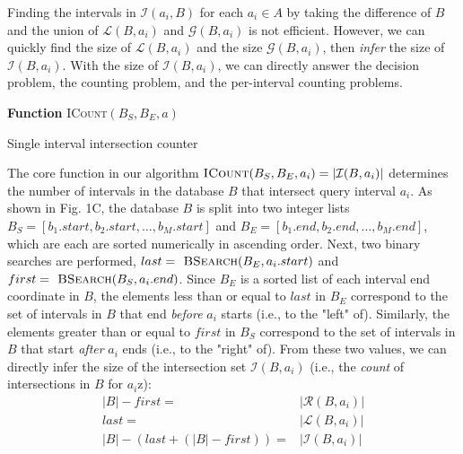 \documentclass{bioinfo}
\begin{document}
Finding the intervals in $\mathcal{I}(a_i,B)$ for each $a_i\in A$ by taking the
difference of $B$ and the union of $\mathcal{L}(B,a_i)$ and $\mathcal{G}(B,a_i)$
is not efficient.  However, we can quickly find the size of $\mathcal{L}(B,a_i)$
and the size $\mathcal{G}(B,a_i)$, then \emph{infer} the size of
$\mathcal{I}(B,a_i)$.  With the size of $\mathcal{I}(B,a_i)$, we can directly
answer the decision problem, the counting problem, and the per-interval counting
problems.

\begin{algorithm}[h]
	\DontPrintSemicolon
	\footnotesize
	\BlankLine
	\textbf{Function} \textsc{ICount}$(B_S,B_E,a)$
	\caption{Single interval intersection counter}
\end{algorithm}

The core function in our algorithm 
$\textsc{ICount}(B_S,B_E,a_i) = |\mathcal{I}(B,a_i)|$ determines the number of
intervals in the database $B$ that intersect query interval $a_i$.  As shown in
Fig. 1C, the database $B$ is split into two integer lists
$B_S = [b_1.start, b_2.start, \dots, b_M.start]$ and 
$B_E = [b_1.end, b_2.end, \dots, b_M.end]$, which are each are sorted
numerically in ascending order.  Next, two binary searches are performed,
$last=\textsc{ BSearch}(B_E, a_i.start)$ and 
$first=\textsc{ BSearch}(B_S, a_i.end)$.  Since $B_E$ is a sorted list of each
interval end coordinate in $B$, the elements less than or equal to $last$ in
$B_E$ correspond to the set of intervals in $B$ that end \emph{before} $a_i$
starts (i.e., to the "left" of).  Similarly, the elements greater than or equal
to $first$ in $B_S$ correspond to the set of intervals in $B$ that start
\emph{after} $a_i$ ends (i.e., to the "right" of).  From these two values, we
can directly infer the size of the intersection set $\mathcal{I}(B,a_i)$ (i.e.,
the \emph{count} of intersections in $B$ for $a_i$z):
\begin{equation*}
	\begin{split}
		|B|-first=&|\mathcal{R}(B,a_i)| \\
		last=&|\mathcal{L}(B,a_i)| \\ 
		|B|-(last+(|B|-first))=&|\mathcal{I}(B,a_i)|
	\end{split}
\end{equation*}
\end{document}
